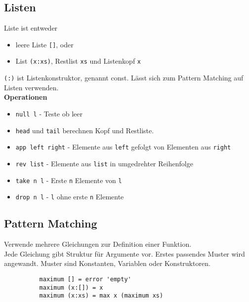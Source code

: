 \documentclass[10pt,a4paper,draft]{article}
\def\code#1{\texttt{#1}}
\begin{document}
        \subsection{Listen}
        Liste ist entweder
        \begin{itemize}
          \item leere Liste \code{[]}, oder
          \item List \code{(x:xs)}, Restlist \code{xs} und Listenkopf \code{x}
        \end{itemize}
        \code{(:)} ist Listenkonstruktor, genannt const.
        Lässt sich zum Pattern Matching auf Listen verwenden.\\
        \textbf{Operationen}
        \begin{itemize}
          \item \code{null l} - Teste ob leer
          \item \code{head} und \code{tail} berechnen Kopf und Restliste.
          \item \code{app left right} - Elemente aus \code{left} gefolgt von Elementen aus \code{right}
          \item \code{rev list} - Elemente aus \code{list} in umgedrehter Reihenfolge
          \item \code{take n l} - Erste \code{n} Elemente von \code{l}
          \item \code{drop n l} - \code{l} ohne erste \code{n} Elemente
        \end{itemize}
          
        \subsection{Pattern Matching}
        Verwende mehrere Gleichungen zur Definition einer Funktion.\\
        Jede Gleichung gibt Struktur für Argumente vor. Erstes passendes Muster wird angewandt.
        Muster sind Konstanten, Variablen oder Konstruktoren.
        \begin{lstlisting}
          maximum [] = error 'empty'
          maximum (x:[]) = x
          maximum (x:xs) = max x (maximum xs)
        \end{lstlisting}
\end{document}
